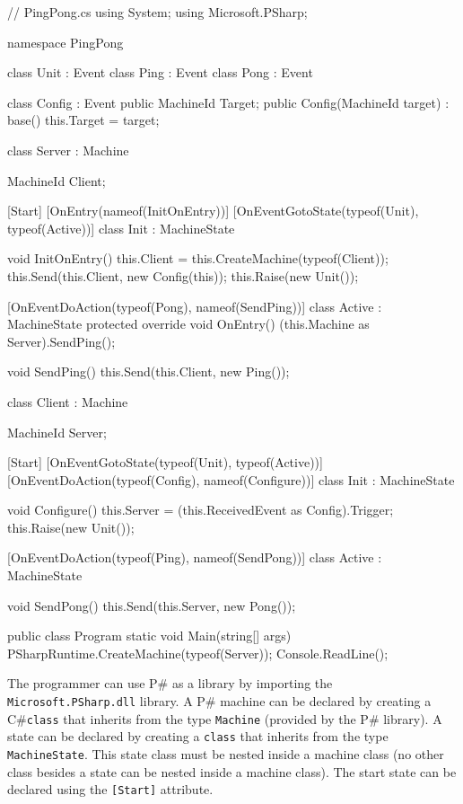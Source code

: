 \documentclass{llncs}
\newcommand{\ps}{P\#\xspace}
\newcommand{\cs}{C\#\xspace}
\begin{document}
\begin{psharp}
// PingPong.cs
using System;
using Microsoft.PSharp;

namespace PingPong {
  class Unit : Event { }
  class Ping : Event { }
  class Pong : Event { }
  
  class Config : Event {
    public MachineId Target;
    public Config(MachineId target) : base() {
      this.Target = target;
    }
  }
  
  class Server : Machine {
    MachineId Client;
    
    [Start]
    [OnEntry(nameof(InitOnEntry))]
    [OnEventGotoState(typeof(Unit), typeof(Active))]
    class Init : MachineState { }
    
    void InitOnEntry() {
      this.Client = this.CreateMachine(typeof(Client));
      this.Send(this.Client, new Config(this));
      this.Raise(new Unit());
    }
    
    [OnEventDoAction(typeof(Pong), nameof(SendPing))]
    class Active : MachineState {
      protected override void OnEntry() {
        (this.Machine as Server).SendPing();
      }
    }
    
    void SendPing() {
      this.Send(this.Client, new Ping());
    }
  }
  
  class Client : Machine {
    MachineId Server;
    
    [Start]
    [OnEventGotoState(typeof(Unit), typeof(Active))]
    [OnEventDoAction(typeof(Config), nameof(Configure))]
    class Init : MachineState { }
    
    void Configure() {
      this.Server = (this.ReceivedEvent as Config).Trigger;
      this.Raise(new Unit());
    }
    
    [OnEventDoAction(typeof(Ping), nameof(SendPong))]
    class Active : MachineState { }
    
    void SendPong() {
      this.Send(this.Server, new Pong());
    }
  }
  
  public class Program {
    static void Main(string[] args) {
      PSharpRuntime.CreateMachine(typeof(Server));
      Console.ReadLine();
    }
  }
}
\end{psharp}

The programmer can use \ps as a library by importing the \texttt{Microsoft.PSharp.dll} library. A \ps machine can be declared by creating a \cs \texttt{class} that inherits from the type \texttt{Machine} (provided by the \ps library). A state can be declared by creating a \texttt{class} that inherits from the type \texttt{MachineState}. This state class must be nested inside a machine class (no other class besides a state can be nested inside a machine class). The start state can be declared using the \texttt{[Start]} attribute.
\end{document}
